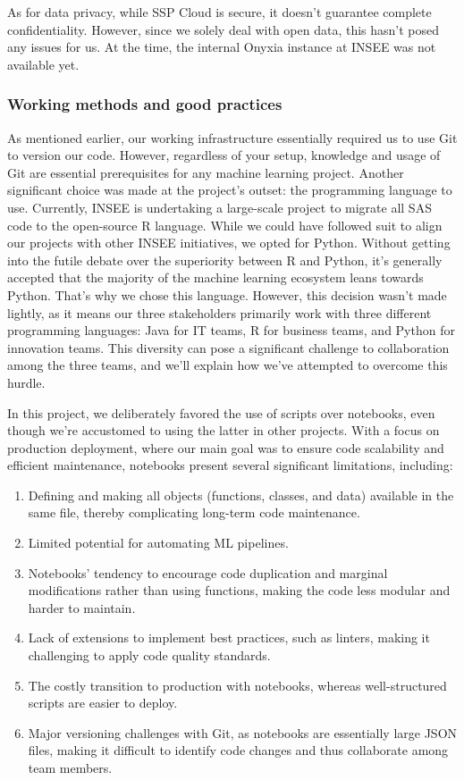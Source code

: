 As for data privacy, while SSP Cloud is secure, it doesn't guarantee complete confidentiality. However, since we solely deal with open data, this hasn't posed any issues for us. At the time, the internal Onyxia instance at INSEE was not available yet.

\subsubsection{Working methods and good practices}

As mentioned earlier, our working infrastructure essentially required us to use Git to version our code. However, regardless of your setup, knowledge and usage of Git are essential prerequisites for any machine learning project. Another significant choice was made at the project's outset: the programming language to use. Currently, INSEE is undertaking a large-scale project to migrate all SAS code to the open-source R language. While we could have followed suit to align our projects with other INSEE initiatives, we opted for Python. Without getting into the futile debate over the superiority between R and Python, it's generally accepted that the majority of the machine learning ecosystem leans towards Python. That's why we chose this language. However, this decision wasn't made lightly, as it means our three stakeholders primarily work with three different programming languages: Java for IT teams, R for business teams, and Python for innovation teams. This diversity can pose a significant challenge to collaboration among the three teams, and we'll explain how we've attempted to overcome this hurdle.

In this project, we deliberately favored the use of scripts over notebooks, even though we're accustomed to using the latter in other projects. With a focus on production deployment, where our main goal was to ensure code scalability and efficient maintenance, notebooks present several significant limitations, including:

\begin{enumerate}
    \item Defining and making all objects (functions, classes, and data) available in the same file, thereby complicating long-term code maintenance.
    \item Limited potential for automating ML pipelines.
    \item Notebooks' tendency to encourage code duplication and marginal modifications rather than using functions, making the code less modular and harder to maintain.
    \item Lack of extensions to implement best practices, such as linters, making it challenging to apply code quality standards.
    \item The costly transition to production with notebooks, whereas well-structured scripts are easier to deploy.
    \item Major versioning challenges with Git, as notebooks are essentially large JSON files, making it difficult to identify code changes and thus collaborate among team members.
\end{enumerate}

